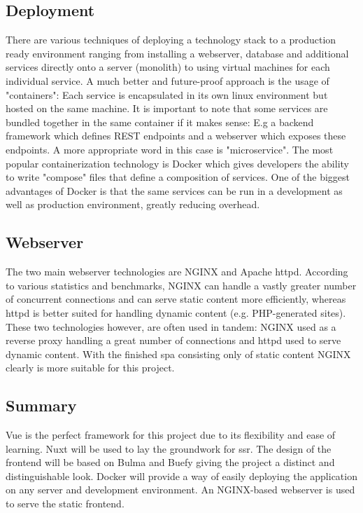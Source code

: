 \subsection{Deployment}
There are various techniques of deploying a technology stack to a production ready environment ranging from installing a webserver, database and additional services directly onto a server (monolith) to using virtual machines for each individual service. A much better and future-proof approach is the usage of "containers": Each service is encapsulated in its own linux environment but hosted on the same machine. It is important to note that some services are bundled together in the same container if it makes sense: E.g a backend framework which defines REST endpoints and a webserver which exposes these endpoints. A more appropriate word in this case is "microservice". The most popular containerization technology is Docker which gives developers the ability to write "compose" files that define a composition of services. One of the biggest advantages of Docker is that the same services can be run in a development as well as production environment, greatly reducing overhead.

\subsection{Webserver}
The two main webserver technologies are NGINX and Apache httpd. According to various statistics and benchmarks, NGINX can handle a vastly greater number of concurrent connections and can serve static content more efficiently, whereas httpd is better suited for handling dynamic content (e.g. PHP-generated sites). These two technologies however, are often used in tandem: NGINX used as a reverse proxy handling a great number of connections and httpd used to serve dynamic content. With the finished \acrfull{spa} consisting only of static content NGINX clearly is more suitable for this project.

\subsection{Summary}
Vue is the perfect framework for this project due to its flexibility and ease of learning. Nuxt will be used to lay the groundwork for \acrshort{ssr}. The design of the frontend will be based on Bulma and Buefy giving the project a distinct and distinguishable look. Docker will provide a way of easily deploying the application on any server and development environment. An NGINX-based webserver is used to serve the static frontend.

